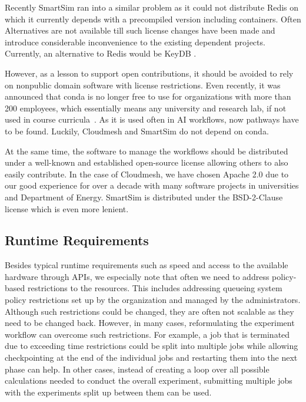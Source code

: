 \documentclass[utf8]{FrontiersinVancouver} %
\begin{document}
Recently SmartSim ran into a similar  problem as it could not distribute Redis on which it currently depends with a precompiled version including containers. Often Alternatives are not available till such license changes have been made and introduce considerable inconvenience to the existing dependent projects. Currently, an alternative to Redis would be KeyDB  \citep{keydb}. 

However, as a lesson to support open contributions, it should be avoided to rely on nonpublic domain software with license restrictions. Even recently, it was announced that conda is no longer free to use for organizations with more than 200 employees, which essentially means any university and research lab, if not used in course curricula~\cite{anaconda}. As it is used often in AI workflows, now pathways have to be found. Luckily, Cloudmesh and SmartSim do not depend on conda. 

At the same time, the software to manage the workflows should be distributed under a well-known and established open-source license allowing others to also easily contribute. In the case of Cloudmesh, we have chosen Apache 2.0 due to our good experience for over a decade with many software projects in universities and Department of Energy.
SmartSim is distributed under the BSD-2-Clause license which is even more lenient.


\subsection{Runtime Requirements}

Besides typical runtime requirements such as speed and access to the available hardware through APIs, we especially note that often we need to address policy-based restrictions to the resources. This includes addressing queueing system policy restrictions set up by the organization and managed by the administrators. Although such restrictions could be changed, they are often not scalable as they need to be changed back. However, in many cases, reformulating the experiment workflow can overcome such restrictions. For example, a job that is terminated due to exceeding time restrictions could be split into multiple jobs while allowing checkpointing at the end of the individual jobs and restarting them into the next phase can help. In other cases, instead of creating a loop over all possible calculations needed to conduct the overall experiment, submitting multiple jobs with the experiments split up between them can be used. 
\end{document}

